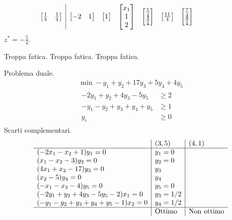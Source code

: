 \begin{equation*}
{\begin{array}{ c|c c c c c c c c c c c c c }
\begin{bmatrix}
\frac{1}{4} & \frac{1}{4}
\end{bmatrix} & \begin{bmatrix}
-2 & 1
\end{bmatrix} & \begin{bmatrix}
1
\end{bmatrix} & \begin{bmatrix}
x_{1}\\
1\\
2
\end{bmatrix} & \begin{bmatrix}
\frac{5}{4}\\
\frac{3}{4}
\end{bmatrix} & \begin{bmatrix}
\frac{11}{4}
\end{bmatrix} & \begin{bmatrix}
\frac{7}{4}\\
\frac{9}{4}
\end{bmatrix} &  &  &  & 
\end{array}
}
\end{equation*}
$z^{*} =-\frac{5}{4}$.














\Es
Troppa fatica.
\Es
Troppa fatica.
\Es
Troppa fatica.



\Es

Problema duale.
\begin{gather*}
\min -y_{1} +y_{2} +17y_{3} +5y_{4} +4y_{5}\\
\begin{aligned}
-2y_{1} +y_{2} +4y_{3} -5y_{5} & \geq 2\\
-y_{1} -y_{2} +y_{3} +y_{4} +y_{5} & \geq 1\\
y_{i} & \geq 0
\end{aligned}
\end{gather*}
Scarti complementari.
\begin{equation*}
\begin{array}{ l|l|l }
 & ( 3,5) & ( 4,1)\\
\hline
( -2x_{1} -x_{2} +1) y_{1} =0 & y_{1} =0 & \\
( x_{1} -x_{2} -3) y_{2} =0 & y_{2} =0 & \\
( 4x_{1} +x_{2} -17) y_{3} =0 & y_{3} & \\
( x_{2} -5) y_{4} =0 & y_{4} & \\
( -x_{1} -x_{2} -4) y_{5} =0 & y_{5} =0 & \\
( -2y_{1} +y_{2} +4y_{3} -5y_{5} -2) x_{1} =0 & y_{3} =1/2 & \\
( -y_{1} -y_{2} +y_{3} +y_{4} +y_{5} -1) x_{2} =0 & y_{4} =1/2 & \\
\hline
 & \text{Ottimo} & \text{Non ottimo}
\end{array}
\end{equation*}
\Es

